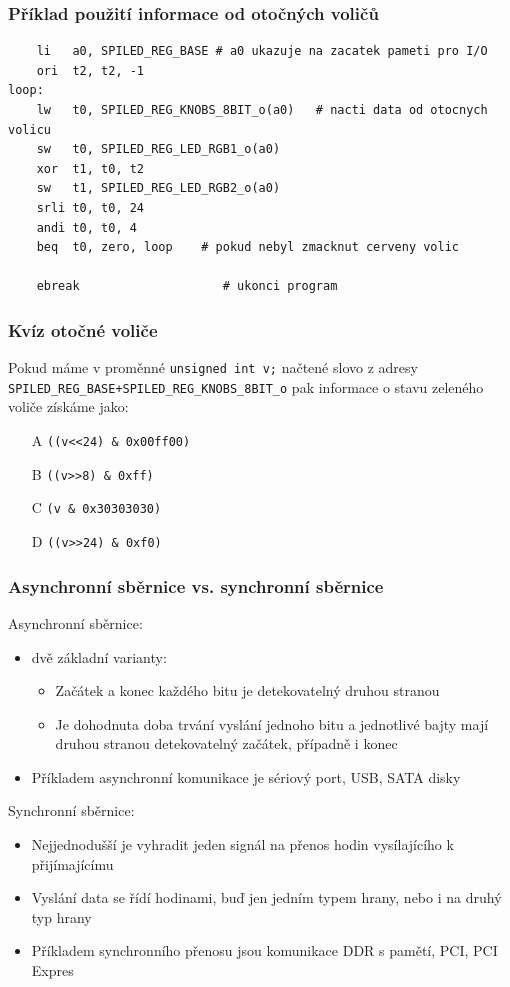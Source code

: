 \documentclass{beamer}
\begin{document}
\begin{frame}[fragile]
\frametitle{Příklad použití informace od otočných voličů}

\begin{verbatim}
    li   a0, SPILED_REG_BASE # a0 ukazuje na zacatek pameti pro I/O
    ori  t2, t2, -1
loop:
    lw   t0, SPILED_REG_KNOBS_8BIT_o(a0)   # nacti data od otocnych volicu
    sw   t0, SPILED_REG_LED_RGB1_o(a0)
    xor  t1, t0, t2
    sw   t1, SPILED_REG_LED_RGB2_o(a0)
    srli t0, t0, 24
    andi t0, t0, 4
    beq  t0, zero, loop    # pokud nebyl zmacknut cerveny volic

    ebreak                    # ukonci program
\end{verbatim}
\end{frame}

\begin{frame}
\frametitle{Kvíz otočné voliče}

Pokud máme v proměnné \texttt{unsigned int v;} načtené slovo z adresy \texttt{SPILED\_REG\_BASE+SPILED\_REG\_KNOBS\_8BIT\_o} pak informace o stavu zeleného voliče získáme jako:
\begin{itemize}
\item[A] \texttt{((v<<24) \& 0x00ff00)}
\item[B] \texttt{((v>>8) \& 0xff)}
\item[C] \texttt{(v \& 0x30303030)}
\item[D] \texttt{((v>>24) \& 0xf0)}
\end{itemize}
\end{frame}



\begin{frame}
\frametitle{Asynchronní sběrnice vs. synchronní sběrnice}

Asynchronní sběrnice:
\begin{itemize}
\item  dvě základní varianty:
\begin{itemize}
\item Začátek a konec každého bitu je detekovatelný druhou stranou
\item Je dohodnuta doba trvání vyslání jednoho bitu a jednotlivé bajty mají druhou stranou detekovatelný začátek, případně i konec
\end{itemize}
\item Příkladem asynchronní komunikace je sériový port, USB, SATA disky
\end{itemize}


Synchronní sběrnice:
\begin{itemize}
\item Nejjednodušší je vyhradit jeden signál na přenos hodin vysílajícího k přijímajícímu
\item Vyslání data se řídí hodinami, buď jen jedním typem hrany, nebo i na druhý typ hrany
\item Příkladem synchronního přenosu jsou komunikace DDR s pamětí, PCI, PCI Expres
\end{itemize}
\end{frame}
\end{document}
